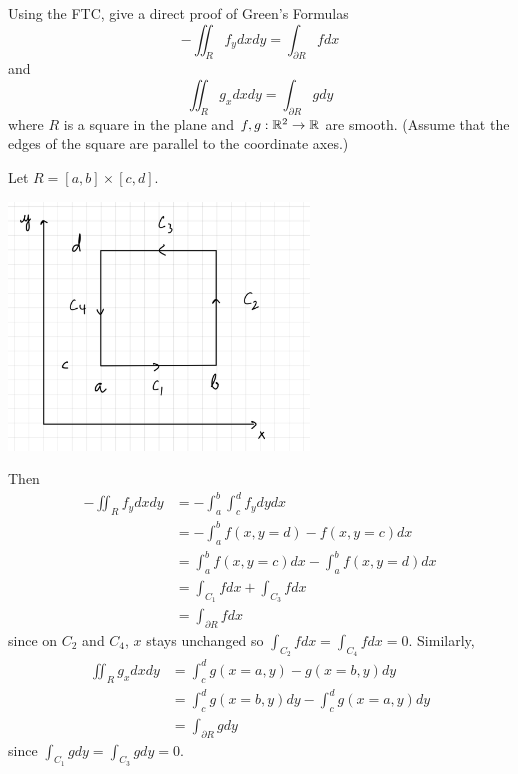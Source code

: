 \documentclass[a4paper, 12pt]{article}
\begin{document}
\begin{problem} 
Using the FTC, give a direct proof of Green's Formulas \[
    - \iint_R f_y dx dy = \int_{\partial R} f dx
\]
and \[
    \iint_R g_x dx dy = \int_{\partial R} g dy
\]
where $R$ is a square in the plane and $f, g: \mathbb{R}^2 \to \mathbb{R}$ are smooth. (Assume that the edges of the square are parallel to the coordinate axes.)
\end{problem}
\begin{solution}
    Let $R = [a, b] \times [c, d]$.
    \begin{center}
    \includegraphics[width=8cm]{./figures/8.2.1.jpeg}
    \end{center}

    Then \begin{align*}
    - \iint_R f_y dx dy &= -\int_{a}^b \int_{c}^{d} f_y dy dx \\
    &= - \int_{a}^{b} f(x, y=d) - f(x, y=c) dx \\
    &= \int_{a}^{b} f(x, y= c) dx - \int_{a}^{b} f(x, y=d) dx \\
    &= \int_{C_1} f dx + \int_{C_3} f dx \\
    &= \int_{\partial R} f dx
    \end{align*}
    since on $C_2$ and $C_4$, $x$ stays unchanged so $\int_{C_2} f dx = \int_{C_4} f dx = 0$.
    Similarly, \begin{align*}
    \iint_R g_x dx dy &= \int_{c}^{d} g(x = a, y) - g(x = b, y) dy \\
    &= \int_{c}^{d} g(x=b, y) dy - \int_{c}^{d} g(x=a, y) dy \\
    &= \int_{\partial R} g dy
    \end{align*}
    since $\int_{C_1} g dy = \int_{C_3} g dy = 0$.
\end{solution}
\end{document}
